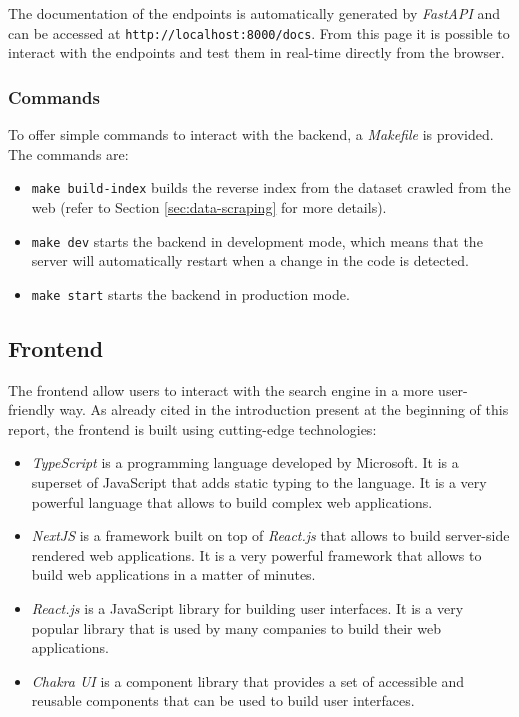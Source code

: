 The documentation of the endpoints is automatically generated by \textit{FastAPI} and can be accessed at \texttt{http://localhost:8000/docs}. From this page it is possible to interact with the endpoints and test them in real-time directly from the browser.

\subsubsection{Commands}

To offer simple commands to interact with the backend, a \textit{Makefile} is provided. The commands are:

\begin{itemize}
  \item \texttt{make build-index} builds the reverse index from the dataset crawled from the web (refer to Section \ref{sec:data-scraping} for more details).
  \item \texttt{make dev} starts the backend in development mode, which means that the server will automatically restart when a change in the code is detected.
  \item \texttt{make start} starts the backend in production mode.
\end{itemize}

\subsection{Frontend}

The frontend allow users to interact with the search engine in a more user-friendly way. As already cited in the introduction present at the beginning of this report, the frontend is built using cutting-edge technologies:

\begin{itemize}
  \item \textit{TypeScript} is a programming language developed by Microsoft. It is a superset of JavaScript that adds static typing to the language. It is a very powerful language that allows to build complex web applications.

  \item \textit{NextJS} is a framework built on top of \textit{React.js} that allows to build server-side rendered web applications. It is a very powerful framework that allows to build web applications in a matter of minutes.

  \item \textit{React.js} is a JavaScript library for building user interfaces. It is a very popular library that is used by many companies to build their web applications.

  \item \textit{Chakra UI} is a component library that provides a set of accessible and reusable components that can be used to build user interfaces.
\end{itemize}

